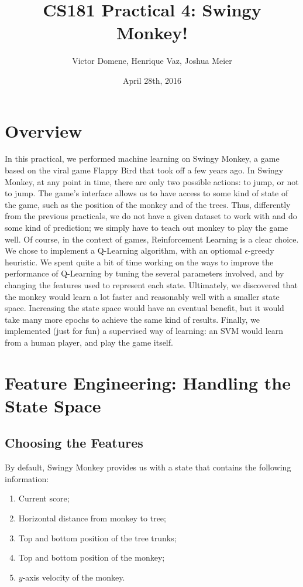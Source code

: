 \documentclass[10pt]{article}
\title{CS181 Practical 4: Swingy Monkey!}
\author{Victor Domene, Henrique Vaz, Joshua Meier}
\date{April 28th, 2016}
\begin{document}
\maketitle

\section{Overview} 

In this practical, we performed machine learning on Swingy Monkey, a game
based on the viral game Flappy Bird that took off a few years ago.
In Swingy Monkey, at any point in time, there are only two possible actions:
to jump, or not to jump. The game's interface allows us to have access to
some kind of state of the game, such as the position of the monkey and of
the trees. Thus, differently from the previous practicals, we do not have
a given dataset to work with and do some kind of prediction; we simply have to
teach out monkey to play the game well. Of course, in the context of games,
Reinforcement Learning is a clear choice. We chose to implement a Q-Learning
algorithm, with an optiomal $\epsilon$-greedy heuristic. We spent quite a bit
of time working on the ways to improve the performance of Q-Learning by tuning
the several parameters involved, and by changing the features used to represent
each state. Ultimately, we discovered that the monkey would learn a lot faster
and reasonably well with a smaller state space. Increasing the state space
would have an eventual benefit, but it would take many more epochs to achieve
the same kind of results. Finally, we implemented (just for fun) a supervised
way of learning: an SVM would learn from a human player, and play the game
itself.

\medskip

\section{Feature Engineering: Handling the State Space} 

\subsection{Choosing the Features}

By default, Swingy Monkey provides us with a state that contains the following
information:

\medskip

\begin{enumerate}
\item Current score;
\item Horizontal distance from monkey to tree;
\item Top and bottom position of the tree trunks;
\item Top and bottom position of the monkey;
\item $y$-axis velocity of the monkey.
\end{enumerate}
\end{document}
